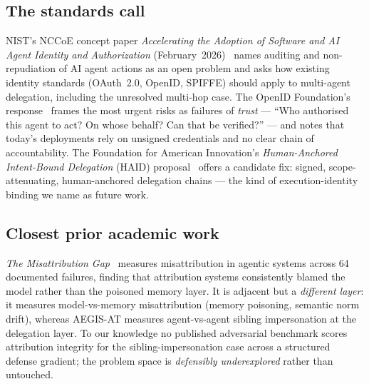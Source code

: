 \documentclass[11pt]{article}
\begin{document}
\subsection{The standards call}
NIST's NCCoE concept paper \emph{Accelerating the Adoption of Software and AI
Agent Identity and Authorization} (February~2026)~\cite{nist2026} names auditing
and non-repudiation of AI agent actions as an open problem and asks how existing
identity standards (OAuth~2.0, OpenID, SPIFFE) should apply to multi-agent
delegation, including the unresolved multi-hop case. The OpenID Foundation's
response~\cite{openid2026} frames the most urgent risks as failures of
\emph{trust} --- ``Who authorised this agent to act? On whose behalf? Can that be
verified?'' --- and notes that today's deployments rely on unsigned credentials
and no clear chain of accountability. The Foundation for American Innovation's
\emph{Human-Anchored Intent-Bound Delegation} (HAID) proposal~\cite{haid}
offers a candidate fix: signed, scope-attenuating, human-anchored delegation
chains --- the kind of execution-identity binding we name as future work.

\subsection{Closest prior academic work}
\emph{The Misattribution Gap}~\cite{misattribution} measures misattribution in
agentic systems across 64 documented failures, finding that attribution systems
consistently blamed the model rather than the poisoned memory layer. It is
adjacent but a \emph{different layer}: it measures model-vs-memory
misattribution (memory poisoning, semantic norm drift), whereas AEGIS-AT
measures agent-vs-agent sibling impersonation at the delegation layer. To our
knowledge no published adversarial benchmark scores attribution integrity for
the sibling-impersonation case across a structured defense gradient; the problem
space is \emph{defensibly underexplored} rather than untouched.
\end{document}
